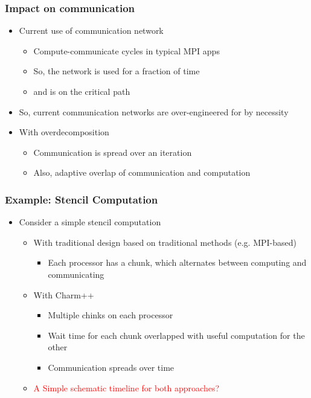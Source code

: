 \begin{frame}[t]
\frametitle{Impact on communication}
  \begin{itemize}
    \item Current use of communication network
    \begin{itemize}
      \item Compute-communicate cycles in typical MPI apps
      \item So, the network is used for a fraction of time
      \item and is on the critical path
    \end{itemize}
    \item So, current communication networks are over-engineered for by necessity
    \item With overdecomposition
    \begin{itemize}
      \item Communication is spread over an iteration
      \item Also, adaptive overlap of communication and computation
    \end{itemize}
  \end{itemize}
\end{frame}

\begin{frame}[t]
\frametitle{Example: Stencil Computation}
  \begin{itemize}
    \item Consider a simple stencil computation
    \begin{itemize}
      \item With traditional design based on traditional methods (e.g.  MPI-based)
      \begin{itemize}
        \item Each processor has a chunk, which alternates between computing and communicating
      \end{itemize}
      \item With Charm++
      \begin{itemize}
        \item Multiple chinks on each processor
        \item Wait time for each chunk overlapped with useful computation for the other
        \item Communication spreads over time
      \end{itemize}
      \item \textcolor{red}{A Simple schematic timeline for both approaches?}
    \end{itemize}
  \end{itemize}
\end{frame}

